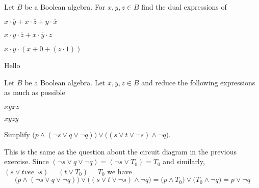 \documentclass[a4paper, english, 12pt]{article} %
\begin{document}
\titlebox

\begin{problem}[3]
  Let $B$ be a Boolean algebra. For $x,y,z \in B$ find the dual expressions of
\end{problem}

\begin{subsubproblem}
  $x \cdot \overline{y} + x \cdot \overline{z} + y \cdot \overline{x}$
\end{subsubproblem}

\begin{subsubproblem}
  $x \cdot y \cdot \overline{z} + x \cdot \overline{y} \cdot z$
\end{subsubproblem}

\begin{subsubproblem}
    $x \cdot y \cdot (x + 0 + (z \cdot 1))$
\end{subsubproblem}

\begin{answer}
  Hello
\end{answer}

\begin{problem}
  Let $B$ be a Boolean algebra. Let $x,y,z \in B$ and reduce the following
  expressions as much as possible
\end{problem}

\begin{subsubproblem}
  $xy\overline{x}z$
\end{subsubproblem}

\begin{subsubproblem}
    $xyzy$
\end{subsubproblem}

\begin{problem}[7]
  Simplify $\bigl( p \wedge (\neg s \vee q \vee \neg q) \bigr) \vee \bigl( (s
  \vee t \vee \neg s) \wedge \neg q \bigr)$.
\end{problem}

\begin{answer}
  This is the same as the question about the circuit diagram in the previous
  exercise. Since $(\neg s \vee q \vee \neg q) = (\neg s \vee T_0) = T_0$
  and similarly, $(s \vee t vee \neg s) = (t \vee T_0) = T_0$ we have
  \begin{equation*}
    \bigl( p \wedge (\neg s \vee q \vee \neg q) \bigr) \vee \bigl( (s
    \vee t \vee \neg s) \wedge \neg q \bigr)
    = \bigl( p \wedge T_0 \bigr) \vee \bigl( T_0 \wedge \neg q \bigr)
    = p \vee \neg q
  \end{equation*}
\end{answer}
\end{document}
